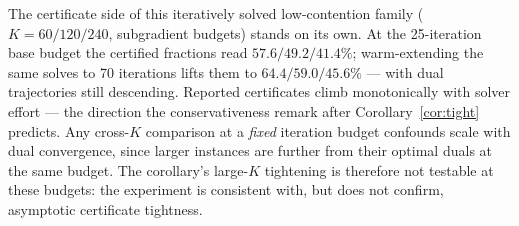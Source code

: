 \documentclass[11pt]{article}
\begin{document}
The certificate side of this iteratively solved low-contention
family ($K = 60/120/240$, subgradient budgets) stands on its own. At
the 25-iteration base budget the certified fractions read
$57.6/49.2/41.4\%$; warm-extending the same solves to 70 iterations
lifts them to $64.4/59.0/45.6\%$ --- with dual trajectories still
descending.
Reported
certificates climb monotonically with solver effort --- the direction
the conservativeness remark after Corollary~\ref{cor:tight}
predicts. Any cross-$K$ comparison at a
\emph{fixed} iteration budget confounds scale with dual convergence,
since larger instances are further from their optimal duals at the
same budget. The corollary's large-$K$ tightening is therefore not
testable at these budgets: the experiment is consistent with, but
does not confirm, asymptotic certificate tightness.
\end{document}

